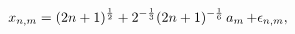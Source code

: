 \[x_{n,m}=(2n+1)^{\frac{1}{2}}+2^{-\frac{1}{3}}(2n+1)^{-\frac{1}{6}}\mathop{a_{m%
}\/}\nolimits+\epsilon_{n,m},\]